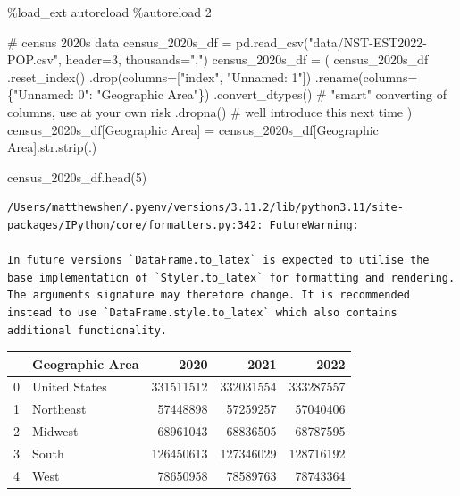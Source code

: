 \documentclass[
  letterpaper,
  DIV=11,
  numbers=noendperiod]{scrreprt}
\newenvironment{Shaded}{\begin{snugshade}}{\end{snugshade}}
\newcommand{\BuiltInTok}[1]{\textcolor[rgb]{0.00,0.23,0.31}{#1}}
\newcommand{\CommentTok}[1]{\textcolor[rgb]{0.37,0.37,0.37}{#1}}
\newcommand{\DecValTok}[1]{\textcolor[rgb]{0.68,0.00,0.00}{#1}}
\newcommand{\NormalTok}[1]{\textcolor[rgb]{0.00,0.23,0.31}{#1}}
\newcommand{\OperatorTok}[1]{\textcolor[rgb]{0.37,0.37,0.37}{#1}}
\newcommand{\StringTok}[1]{\textcolor[rgb]{0.13,0.47,0.30}{#1}}
\begin{document}
\begin{Shaded}
\begin{Highlighting}[]
\OperatorTok{\%}\NormalTok{load\_ext autoreload}
\OperatorTok{\%}\NormalTok{autoreload }\DecValTok{2}
\end{Highlighting}
\end{Shaded}

\begin{Shaded}
\begin{Highlighting}[]
\CommentTok{\# census 2020s data}
\NormalTok{census\_2020s\_df }\OperatorTok{=}\NormalTok{ pd.read\_csv(}\StringTok{"data/NST{-}EST2022{-}POP.csv"}\NormalTok{, header}\OperatorTok{=}\DecValTok{3}\NormalTok{, thousands}\OperatorTok{=}\StringTok{","}\NormalTok{)}
\NormalTok{census\_2020s\_df }\OperatorTok{=}\NormalTok{ (}
\NormalTok{    census\_2020s\_df}
\NormalTok{    .reset\_index()}
\NormalTok{    .drop(columns}\OperatorTok{=}\NormalTok{[}\StringTok{"index"}\NormalTok{, }\StringTok{"Unnamed: 1"}\NormalTok{])}
\NormalTok{    .rename(columns}\OperatorTok{=}\NormalTok{\{}\StringTok{"Unnamed: 0"}\NormalTok{: }\StringTok{"Geographic Area"}\NormalTok{\})}
\NormalTok{    .convert\_dtypes()                 }\CommentTok{\# "smart" converting of columns, use at your own risk}
\NormalTok{    .dropna()                         }\CommentTok{\# we\textquotesingle{}ll introduce this next time}
\NormalTok{)}
\NormalTok{census\_2020s\_df[}\StringTok{\textquotesingle{}Geographic Area\textquotesingle{}}\NormalTok{] }\OperatorTok{=}\NormalTok{ census\_2020s\_df[}\StringTok{\textquotesingle{}Geographic Area\textquotesingle{}}\NormalTok{].}\BuiltInTok{str}\NormalTok{.strip(}\StringTok{\textquotesingle{}.\textquotesingle{}}\NormalTok{)}

\NormalTok{census\_2020s\_df.head(}\DecValTok{5}\NormalTok{)}
\end{Highlighting}
\end{Shaded}

\begin{verbatim}
/Users/matthewshen/.pyenv/versions/3.11.2/lib/python3.11/site-packages/IPython/core/formatters.py:342: FutureWarning:

In future versions `DataFrame.to_latex` is expected to utilise the base implementation of `Styler.to_latex` for formatting and rendering. The arguments signature may therefore change. It is recommended instead to use `DataFrame.style.to_latex` which also contains additional functionality.
\end{verbatim}

\begin{tabular}{llrrr}
\toprule
{} & Geographic Area &       2020 &       2021 &       2022 \\
\midrule
0 &   United States &  331511512 &  332031554 &  333287557 \\
1 &       Northeast &   57448898 &   57259257 &   57040406 \\
2 &         Midwest &   68961043 &   68836505 &   68787595 \\
3 &           South &  126450613 &  127346029 &  128716192 \\
4 &            West &   78650958 &   78589763 &   78743364 \\
\bottomrule
\end{tabular}
\end{document}
